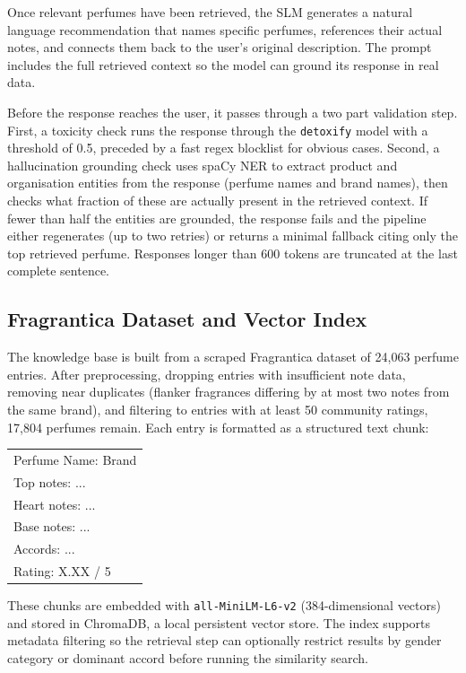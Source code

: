 \documentclass[11pt,a4paper]{article}
\begin{document}
Once relevant perfumes have been retrieved, the SLM generates a natural language recommendation that names specific perfumes, references their actual notes, and connects them back to the user's original description. The prompt includes the full retrieved context so the model can ground its response in real data.

Before the response reaches the user, it passes through a two part validation step. First, a toxicity check runs the response through the \texttt{detoxify} model \citep{hanu2020detoxify} with a threshold of 0.5, preceded by a fast regex blocklist for obvious cases. Second, a hallucination grounding check uses spaCy \citep{honnibal2020spacy} NER to extract product and organisation entities from the response (perfume names and brand names), then checks what fraction of these are actually present in the retrieved context. If fewer than half the entities are grounded, the response fails and the pipeline either regenerates (up to two retries) or returns a minimal fallback citing only the top retrieved perfume. Responses longer than 600 tokens are truncated at the last complete sentence.

\subsection{Fragrantica Dataset and Vector Index}

The knowledge base is built from a scraped Fragrantica dataset of 24,063 perfume entries. After preprocessing, dropping entries with insufficient note data, removing near duplicates (flanker fragrances differing by at most two notes from the same brand), and filtering to entries with at least 50 community ratings, 17,804 perfumes remain. Each entry is formatted as a structured text chunk:

\begin{center}
\small\ttfamily
\begin{tabular}{l}
Perfume Name: Brand\\
Top notes: ...\\
Heart notes: ...\\
Base notes: ...\\
Accords: ...\\
Rating: X.XX / 5
\end{tabular}
\end{center}

These chunks are embedded with \texttt{all-MiniLM-L6-v2} (384-dimensional vectors) and stored in ChromaDB, a local persistent vector store. The index supports metadata filtering so the retrieval step can optionally restrict results by gender category or dominant accord before running the similarity search.
\end{document}
